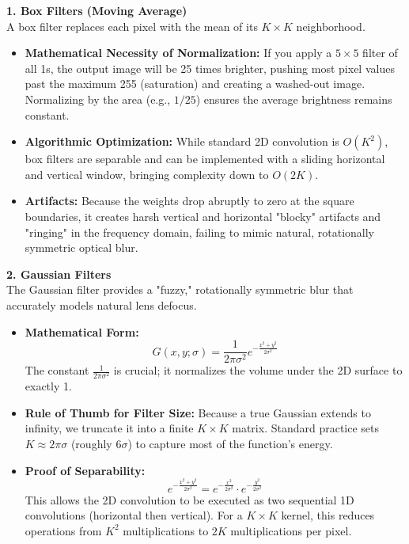 \documentclass[12pt]{article}
\begin{document}
\textbf{1. Box Filters (Moving Average)} \\
A box filter replaces each pixel with the mean of its $K \times K$ neighborhood.

\begin{itemize}
    \item \textbf{Mathematical Necessity of Normalization:} If you apply a $5 \times 5$ filter of all 1s, the output image will be 25 times brighter, pushing most pixel values past the maximum 255 (saturation) and creating a washed-out image. Normalizing by the area (e.g., $1/25$) ensures the average brightness remains constant.
    \item \textbf{Algorithmic Optimization:} While standard 2D convolution is $O(K^2)$, box filters are separable and can be implemented with a sliding horizontal and vertical window, bringing complexity down to $O(2K)$.
    \item \textbf{Artifacts:} Because the weights drop abruptly to zero at the square boundaries, it creates harsh vertical and horizontal "blocky" artifacts and "ringing" in the frequency domain, failing to mimic natural, rotationally symmetric optical blur.
\end{itemize}

\textbf{2. Gaussian Filters} \\
The Gaussian filter provides a "fuzzy," rotationally symmetric blur that accurately models natural lens defocus.

\begin{itemize}
    \item \textbf{Mathematical Form:}
          \[
              G(x,y;\sigma) = \frac{1}{2\pi\sigma^2} e^{-\frac{x^2+y^2}{2\sigma^2}}
          \]
          The constant $\frac{1}{2\pi\sigma^2}$ is crucial; it normalizes the volume under the 2D surface to exactly 1.
    \item \textbf{Rule of Thumb for Filter Size:} Because a true Gaussian extends to infinity, we truncate it into a finite $K \times K$ matrix. Standard practice sets $K \approx 2\pi\sigma$ (roughly $6\sigma$) to capture most of the function's energy.
    \item \textbf{Proof of Separability:}
          \[
              e^{-\frac{x^2+y^2}{2\sigma^2}} = e^{-\frac{x^2}{2\sigma^2}} \cdot e^{-\frac{y^2}{2\sigma^2}}
          \]
          This allows the 2D convolution to be executed as two sequential 1D convolutions (horizontal then vertical). For a $K \times K$ kernel, this reduces operations from $K^2$ multiplications to $2K$ multiplications per pixel.
\end{itemize}
\end{document}
